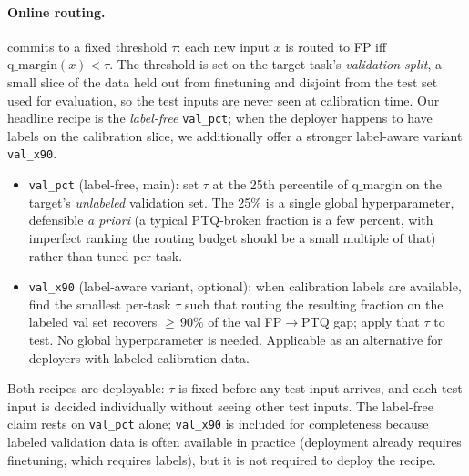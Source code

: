 \documentclass{article}
\newcommand{\fp}{\textsc{FP}\xspace}
\newcommand{\ptq}{\textsc{PTQ}\xspace}
\begin{document}
\paragraph{Online routing.} commits to a fixed threshold $\tau$: each new input $x$ is routed to FP iff $\mathrm{q\_margin}(x) < \tau$. The threshold is set on the target task's \emph{validation split}, a small slice of the data held out from finetuning and disjoint from the test set used for evaluation, so the test inputs are never seen at calibration time. Our headline recipe is the \emph{label-free} \texttt{val\_pct}; when the deployer happens to have labels on the calibration slice, we additionally offer a stronger label-aware variant \texttt{val\_x90}.
\begin{itemize}[leftmargin=*,topsep=2pt,itemsep=0pt]
  \item \texttt{val\_pct} (label-free, main): set $\tau$ at the 25th percentile of $\mathrm{q\_margin}$ on the target's \emph{unlabeled} validation set. The 25\% is a single global hyperparameter, defensible \emph{a priori} (a typical PTQ-broken fraction is a few percent, with imperfect ranking the routing budget should be a small multiple of that) rather than tuned per task.
  \item \texttt{val\_x90} (label-aware variant, optional): when calibration labels are available, find the smallest per-task $\tau$ such that routing the resulting fraction on the labeled val set recovers $\geq$\,90\% of the val \fp$\to$\ptq{} gap; apply that $\tau$ to test. No global hyperparameter is needed. Applicable as an alternative for deployers with labeled calibration data.
\end{itemize}
Both recipes are deployable: $\tau$ is fixed before any test input arrives, and each test input is decided individually without seeing other test inputs. The label-free claim rests on \texttt{val\_pct} alone; \texttt{val\_x90} is included for completeness because labeled validation data is often available in practice (deployment already requires finetuning, which requires labels), but it is not required to deploy the recipe.
\end{document}
